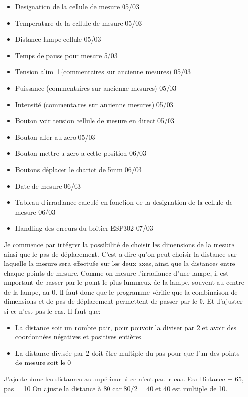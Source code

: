\documentclass[12pt]{article}
\begin{document}
\begin{itemize}
	\item [ ] Designation de la cellule de mesure  05/03
	\item [ ] Temperature de la cellule de mesure  05/03
	\item [ ] Distance lampe cellule  05/03
	\item [ ] Temps de pause pour mesure  5/03
	\item [ ] Tension alim ±(commentaires sur ancienne mesures)  05/03
	\item [ ] Puissance (commentaires sur ancienne mesures)  05/03
	\item [ ] Intensité (commentaires sur ancienne mesures)  05/03
	\item [ ] Bouton voir tension cellule de mesure en direct  05/03
	\item [ ] Bouton aller au zero  05/03
	\item [ ] Bouton mettre a zero a cette position  06/03
	\item [ ] Boutons déplacer le chariot de 5mm  06/03
	\item [ ] Date de mesure  06/03
	\item [ ] Tableau d'irradiance calculé en fonction de la designation de la cellule de mesure  06/03
	\item [ ] Handling des erreurs du boitier ESP302 07/03
\end{itemize}

Je commence par intégrer la possibilité de choisir les dimensions de la mesure ainsi que le pas de déplacement.
C'est a dire qu'on peut choisir la distance sur laquelle la mesure sera effectuée sur les deux axes, ainsi que la distances entre chaque points de mesure.
Comme on mesure l'irradiance d'une lampe, il est important de passer par le point le plus lumineux de la lampe, souvent au centre de la lampe, au 0.
Il faut donc que le programme vérifie que la combinaison de dimensions et de pas de déplacement permettent de passer par le 0.
Et d'ajuster si ce n'est pas le cas.
Il faut que:
\begin{itemize}
	\item La distance soit un nombre pair, pour pouvoir la diviser par 2 et avoir des coordonnées négatives et positives entières
	\item La distance divisée par 2 doit être multiple du pas pour que l'un des points de mesure soit le 0
\end{itemize}


J'ajuste donc les distances au supérieur si ce n'est pas le cas. Ex:
Distance = 65, pas = 10
On ajuste la distance à 80 car $80/2 = 40$ et 40 est multiple de 10.
\end{document}
